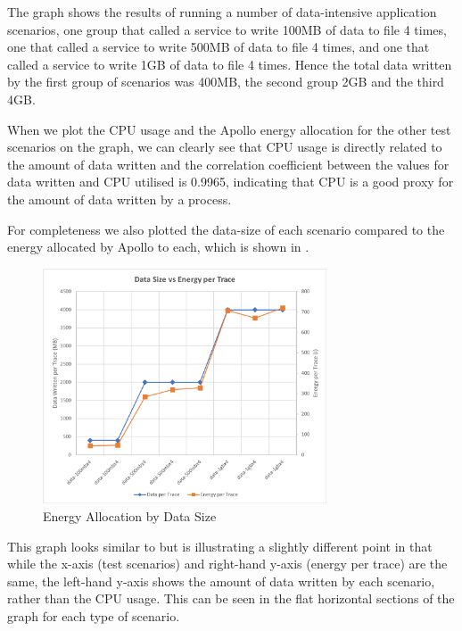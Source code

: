 The graph shows the results of running a number of data-intensive application scenarios, one group that called a service to write 100MB of data to file 4 times, one that called a service to write 500MB of data to file 4 times, and one that called a service to write 1GB of data to file 4 times.  Hence the total data written by the first group of scenarios was 400MB, the second group 2GB and the third 4GB.

When we plot the CPU usage and the Apollo energy allocation for the other test scenarios on the graph, we can clearly see that CPU usage is directly related to the amount of data written and the correlation coefficient between the values for data written and CPU utilised is 0.9965, indicating that CPU is a good proxy for the amount of data written by a process.

For completeness we also plotted the data-size of each scenario compared to the energy allocated by Apollo to each, which is shown in .  

\begin{figure}
\centering
\includegraphics[width=0.75\textwidth]{Figures/validation-energybydatasize}
\caption{Energy Allocation by Data Size}
\label{figure:validation-energybydatasize}
\end{figure}

This graph looks similar to  but is illustrating a slightly different point in that while the x-axis (test scenarios) and right-hand y-axis (energy per trace) are the same, the left-hand y-axis shows the amount of data written by each scenario, rather than the CPU usage.  This can be seen in the flat horizontal sections of the graph for each type of scenario.  


